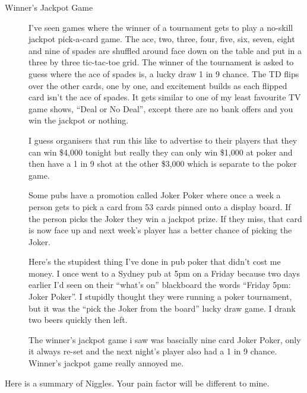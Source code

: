 \begin{description}
\item[Winner's Jackpot Game] I've seen games where the winner of a
tournament gets to play a no-skill jackpot pick-a-card game. The ace, two,
three, four, five, six, seven, eight and nine of spades are shuffled
around face down on the table and put in a three by three tic-tac-toe
grid. The winner of the tournament is asked to guess where the ace of
spades is, a lucky draw 1 in 9 chance. The TD flips over the other
cards, one by one, and excitement builds as each flipped card isn't
the ace of spades. It gets similar to one of my least favourite TV
game shows, ``Deal or No Deal'', except there are no bank offers and you
win the jackpot or nothing.

I guess organisers that run this like to advertise to their players that
they can win \$4,000 tonight but really they can only win \$1,000 at
poker and then have a 1 in 9 shot at the other \$3,000 which is
separate to the poker game.

Some pubs have a promotion called Joker Poker where once a week
a person gets to pick a card from 53 cards pinned onto a display
board. If the person picks the Joker they win a jackpot prize. If they
miss, that card is now face up and next week's player has a better
chance of picking the Joker.

Here's the stupidest thing I've done in pub poker that didn't cost me
money. I once went to a Sydney pub at 5pm on a Friday because two days
earlier I'd seen on their ``what's on'' blackboard the words ``Friday
5pm: Joker Poker''. I stupidly thought they were running a poker
tournament, but it was the ``pick the Joker from the board'' lucky
draw game. I drank two beers quickly then left.

The winner's jackpot game i saw was bascially nine card Joker Poker,
only it always re-set and the next night's player also had a 1 in 9
chance. Winner's jackpot game really annoyed me.

\end{description}

Here is a summary of Niggles. Your pain factor will be different to
mine.

